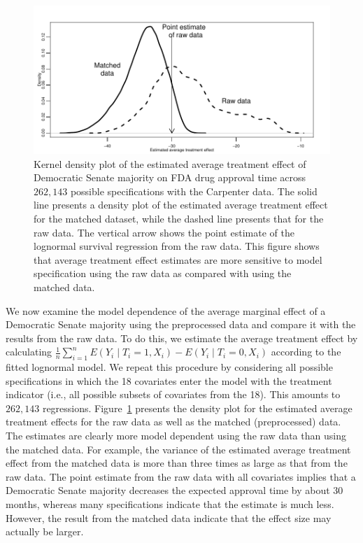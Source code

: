 \documentclass[11pt,titlepage]{article}
\begin{document}
\begin{figure}[t] 
 \begin{center}
    \includegraphics{figs/fdadens.pdf}
  \end{center}
  \vspace{-0.275in}
  \caption{Kernel density plot of the estimated average treatment effect of
    Democratic Senate majority on FDA drug approval time across $262,143$
    possible specifications with the Carpenter data. The solid line
    presents a density plot of the estimated average treatment effect for
    the matched dataset, while the dashed line presents that for the
    raw data.  The vertical arrow shows the point estimate of the
    lognormal survival regression from the raw data.  This figure
    shows that average treatment effect estimates are more sensitive
    to model specification using the raw data as compared with using
    the matched data.}
  \label{fg:fdadens}
\end{figure}

We now examine the model dependence of the average marginal effect of a
Democratic Senate majority using the preprocessed data and compare it
with the results from the raw data.  To do this, we estimate the
average treatment effect by calculating $\frac{1}{n} \sum_{i=1}^n
E(Y_i \mid T_i = 1, X_i)-E(Y_i \mid T_i =0 ,X_i)$ according to the
fitted lognormal model. We repeat this procedure by considering all possible
specifications in which the 18 covariates enter the model with the treatment indicator (i.e., all possible
subsets of covariates from the 18).  This amounts to $262,143$ regressions.
Figure~\ref{fg:fdadens} presents the density plot for the estimated
average treatment effects for the raw data as well as the matched (preprocessed)
data. The estimates are clearly more model dependent using the
raw data than using the matched data. For example, the variance
of the estimated average treatment effect from the matched data is more
than three times as large as that from the raw data. The point
estimate from the raw data with all covariates implies that a Democratic
Senate majority decreases the expected approval time by about 30
months, whereas many specifications indicate that the estimate is much
less.  However, the result from the matched data indicate that the
effect size may actually be larger.
\end{document}
